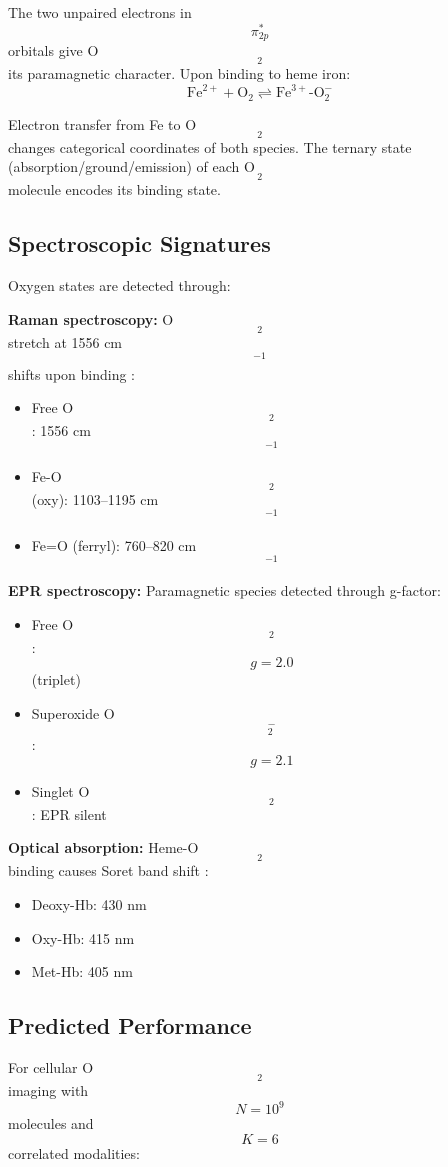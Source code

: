 \documentclass[twocolumn,10pt]{article}
\begin{document}
The two unpaired electrons in $$\pi_{2p}^*$$ orbitals give O$$_2$$ its paramagnetic character. Upon binding to heme iron:
\begin{equation}
\text{Fe}^{2+} + \text{O}_2 \rightleftharpoons \text{Fe}^{3+}\text{-O}_2^{-}
\end{equation}

Electron transfer from Fe to O$$_2$$ changes categorical coordinates of both species. The ternary state (absorption/ground/emission) of each O$$_2$$ molecule encodes its binding state.

\subsection{Spectroscopic Signatures}

Oxygen states are detected through:

\textbf{Raman spectroscopy:} O$$_2$$ stretch at 1556 cm$$^{-1}$$ shifts upon binding \cite{Spiro1985}:
\begin{itemize}
\item Free O$$_2$$: 1556 cm$$^{-1}$$
\item Fe-O$$_2$$ (oxy): 1103--1195 cm$$^{-1}$$
\item Fe=O (ferryl): 760--820 cm$$^{-1}$$
\end{itemize}

\textbf{EPR spectroscopy:} Paramagnetic species detected through g-factor:
\begin{itemize}
\item Free O$$_2$$: $$g = 2.0$$ (triplet)
\item Superoxide O$$_2^-$$: $$g = 2.1$$
\item Singlet O$$_2$$: EPR silent
\end{itemize}

\textbf{Optical absorption:} Heme-O$$_2$$ binding causes Soret band shift \cite{Antonini1971}:
\begin{itemize}
\item Deoxy-Hb: 430 nm
\item Oxy-Hb: 415 nm
\item Met-Hb: 405 nm
\end{itemize}

\subsection{Predicted Performance}

For cellular O$$_2$$ imaging with $$N = 10^9$$ molecules and $$K = 6$$ correlated modalities:
\end{document}

